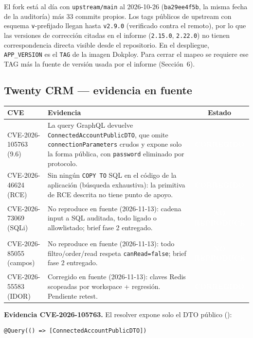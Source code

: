 \documentclass[11pt,a4paper]{article}
\newcommand{\badge}[2]{\colorbox{#1}{\textcolor{white}{\strut\footnotesize\bfseries #2}}}
\newcommand{\FIXED}{\badge{stOk}{CORREGIDO}}
\newcommand{\NREPROS}{\badge{stInfo}{NO REPRODUCE}}
\begin{document}
El fork está al día con \texttt{upstream/main} al 2026-10-26
(\texttt{ba29ee4f5b}, la misma fecha de la auditoría) más 33 commits propios. Los
tags públicos de upstream con esquema \texttt{v}-prefijado llegan hasta
\texttt{v2.9.0} (verificado contra el remoto), por lo que las versiones de
corrección citadas en el informe (\texttt{2.15.0}, \texttt{2.22.0}) no tienen
correspondencia directa visible desde el repositorio. En el despliegue,
\texttt{APP\_VERSION} es el \texttt{TAG} de la imagen Dokploy. Para cerrar el mapeo
se requiere ese TAG más la fuente de versión usada por el informe (Sección~6).

\subsection{Twenty CRM --- evidencia en fuente}

\begin{center}
\footnotesize
\begin{tabular}{@{}l>{\raggedright\arraybackslash}p{8.0cm}c@{}}
\toprule
CVE & Evidencia & Estado \\
\midrule
CVE-2026-105763 (9.6) &
La query GraphQL devuelve \texttt{ConnectedAccountPublicDTO}, que omite
\texttt{connectionParameters} crudos y expone solo la forma pública, con
\texttt{password} eliminado por protocolo. &
\FIXED{} \\
CVE-2026-46624 (RCE) &
Sin ningún \texttt{COPY TO} SQL en el código de la aplicación
(búsqueda exhaustiva): la primitiva de RCE descrita no tiene punto de apoyo. &
\FIXED{} \\
CVE-2026-73069 (SQLi) &
No reproduce en fuente (2026-11-13): cadena input a SQL auditada, todo ligado o
allowlistado; brief fase 2 entregado. &
\NREPROS{} \\
CVE-2026-85055 (campos) &
No reproduce en fuente (2026-11-13): todo filtro/order/read respeta
\texttt{canRead=false}; brief fase 2 entregado. &
\NREPROS{} \\
CVE-2026-55583 (IDOR) &
Corregido en fuente (2026-11-13): claves Redis scopeadas por workspace +
regresión. Pendiente retest. &
\FIXED{} \\
\bottomrule
\end{tabular}
\end{center}

\textbf{Evidencia CVE-2026-105763.} El resolver expone solo el DTO público
():

\begin{lstlisting}[style=ts]
@Query(() => [ConnectedAccountPublicDTO])
\end{lstlisting}
\end{document}
